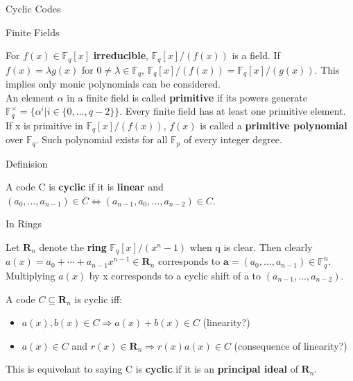 \documentclass[12pt, letterpaper]{article}
\newcommand{\F}{\mathbb{F}}
\begin{document}
\begin{section}{Cyclic Codes}

  \begin{subsection}{Finite Fields}

    For \(f(x) \in \F_{q}[x]\) \textbf{irreducible}, \(\F_{q}[x] / (f(x))\) is
    a field. If \(f(x) = \lambda g(x)\) for \(0 \neq \lambda \in \F_{q}\),
    \(\F_{q}[x] / (f(x)) = \F_{q}[x] / (g(x))\). This implies only monic
    polynomials can be considered. \\
    An element \(\alpha\) in a finite field is called \textbf{primitive} if its
    powers generate
    \(\F^{\times}_{q} = \{\alpha^{i} | i \in \{0, \dots , q - 2\}\}\). Every
    finite field has at least one primitive element. If x is primitive in
    \(\F_{q}[x] / (f(x))\), \(f(x)\) is called a \textbf{primitive polynomial}
    over \(\F_{q}\). Such polynomial exists for all \(\F_{p}\) of every integer
    degree.

  \end{subsection}

  \begin{subsection}{Definision}

    A code C is \textbf{cyclic} if it is \textbf{linear} and
    \((a_{0}, \dots , a_{n - 1}) \in C \iff (a_{n - 1}, a_{0}, \dots ,
    a_{n - 2}) \in C\).

    \begin{subsubsection}{In Rings}

      Let \(\textbf{R}_{n}\) denote the \textbf{ring}
      \(\F_{q}[x] / (x^{n} - 1)\) when q is clear. Then clearly
      \(a(x) = a_{0} + \cdots + a_{n - 1} x^{n - 1} \in \textbf{R}_{n}\)
      corresponds to
      \(\textbf{a} = (a_{0}, \dots , a_{n - 1}) \in \F^{n}_{q}\). Multiplying
      \(a(x)\) by x corresponds to a cyclic shift of a to \((a_{n - 1}, \dots ,
      a_{n - 2})\).

      A code \(C \subseteq \textbf{R}_{n}\) is cyclic iff:
      \begin{itemize}
        \item \(a(x), b(x) \in C \Rightarrow a(x) + b(x) \in C\) (linearity?)
        \item \(a(x) \in C\) and
              \(r(x) \in \textbf{R}_{n} \Rightarrow r(x)a(x) \in C\)
              (consequence of linearity?)
      \end{itemize}

      This is equivelant to saying C is \textbf{cyclic} if it is an
      \textbf{principal ideal} of \(\textbf{R}_{n}\).


\end{subsubsection}
\end{subsection}
\end{section}
\end{document}
